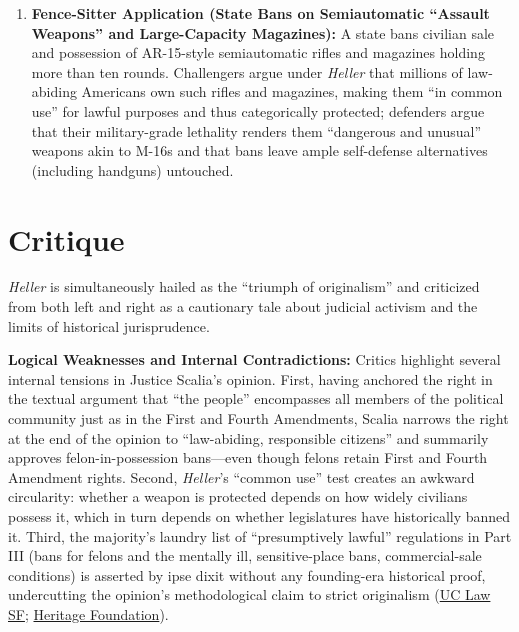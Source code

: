 \documentclass[12pt]{article}
\begin{document}
\begin{enumerate}
  \item \textbf{Fence-Sitter Application (State Bans on Semiautomatic ``Assault Weapons'' and Large-Capacity Magazines):} A state bans civilian sale and possession of AR-15-style semiautomatic rifles and magazines holding more than ten rounds. Challengers argue under \textit{Heller} that millions of law-abiding Americans own such rifles and magazines, making them ``in common use'' for lawful purposes and thus categorically protected; defenders argue that their military-grade lethality renders them ``dangerous and unusual'' weapons akin to M-16s and that bans leave ample self-defense alternatives (including handguns) untouched.
\end{enumerate}

\section{Critique}
\textit{Heller} is simultaneously hailed as the ``triumph of originalism'' and criticized from both left and right as a cautionary tale about judicial activism and the limits of historical jurisprudence.

\textbf{Logical Weaknesses and Internal Contradictions:} Critics highlight several internal tensions in Justice Scalia's opinion. First, having anchored the right in the textual argument that ``the people'' encompasses all members of the political community just as in the First and Fourth Amendments, Scalia narrows the right at the end of the opinion to ``law-abiding, responsible citizens'' and summarily approves felon-in-possession bans---even though felons retain First and Fourth Amendment rights. Second, \textit{Heller}'s ``common use'' test creates an awkward circularity: whether a weapon is protected depends on how widely civilians possess it, which in turn depends on whether legislatures have historically banned it. Third, the majority's laundry list of ``presumptively lawful'' regulations in Part III (bans for felons and the mentally ill, sensitive-place bans, commercial-sale conditions) is asserted by ipse dixit without any founding-era historical proof, undercutting the opinion's methodological claim to strict originalism (\href{https://repository.uclawsf.edu/cgi/viewcontent.cgi?article=1426&context=faculty_scholarship}{UC Law SF}; \href{https://www.heritage.org/courts/report/long-standing-and-presumptively-lawful-hellers-dicta-vs-history-and-dicta}{Heritage Foundation}).
\end{document}
